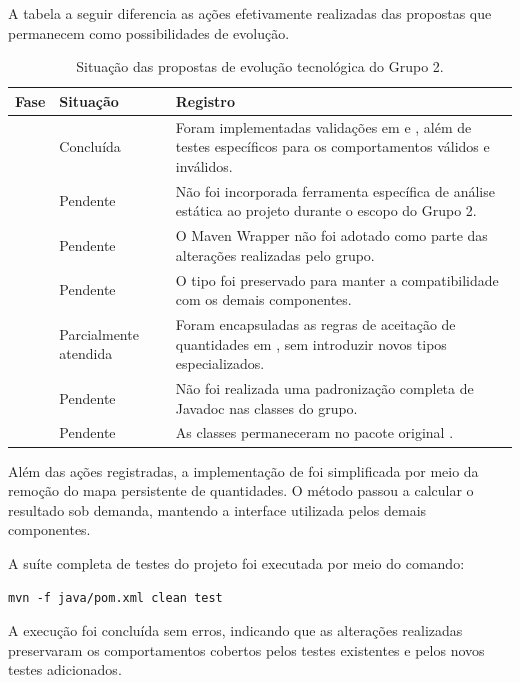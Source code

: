 A tabela a seguir diferencia as ações efetivamente realizadas das propostas que permanecem como possibilidades de evolução.

\begin{table}[H]\centering\small
\begin{tabularx}{\textwidth}{>{\raggedright\arraybackslash}p{1.2cm}>{\raggedright\arraybackslash}p{3.2cm}Y}
\toprule
\textbf{Fase} & \textbf{Situação} & \textbf{Registro} \\
 & Concluída & Foram implementadas validações em  e , além de testes específicos para os comportamentos válidos e inválidos. \\
 & Pendente & Não foi incorporada ferramenta específica de análise estática ao projeto durante o escopo do Grupo 2. \\
 & Pendente & O Maven Wrapper não foi adotado como parte das alterações realizadas pelo grupo. \\
 & Pendente & O tipo  foi preservado para manter a compatibilidade com os demais componentes. \\
 & Parcialmente atendida & Foram encapsuladas as regras de aceitação de quantidades em , sem introduzir novos tipos especializados. \\
 & Pendente & Não foi realizada uma padronização completa de Javadoc nas classes do grupo. \\
 & Pendente & As classes permaneceram no pacote original . \\
\bottomrule
\end{tabularx}
\caption{Situação das propostas de evolução tecnológica do Grupo 2.}
\end{table}

Além das ações registradas, a implementação de  foi simplificada por meio da remoção do mapa persistente de quantidades. O método  passou a calcular o resultado sob demanda, mantendo a interface utilizada pelos demais componentes.

A suíte completa de testes do projeto foi executada por meio do comando:

\begin{lstlisting}
mvn -f java/pom.xml clean test
\end{lstlisting}

A execução foi concluída sem erros, indicando que as alterações realizadas preservaram os comportamentos cobertos pelos testes existentes e pelos novos testes adicionados.

